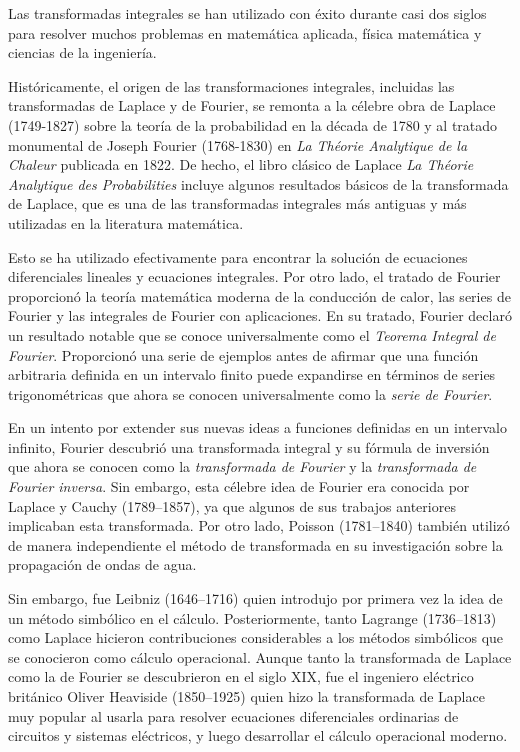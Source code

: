 Las transformadas integrales se han utilizado con éxito durante casi dos siglos para resolver muchos problemas en matemática aplicada, física matemática y ciencias de la ingeniería.
\par
Históricamente, el origen de las transformaciones integrales, incluidas las transformadas de Laplace y de Fourier, se remonta a la célebre obra de Laplace (1749-1827) sobre la teoría de la probabilidad en la década de 1780 y al tratado monumental de Joseph Fourier (1768-1830) en \emph{La Théorie Analytique de la Chaleur} publicada en 1822. De hecho, el libro clásico de Laplace \emph{La Théorie Analytique des Probabilities} incluye algunos resultados básicos de la transformada de Laplace, que es una de las transformadas integrales más antiguas y más utilizadas en la literatura matemática. 
\par
Esto se ha utilizado efectivamente para encontrar la solución de ecuaciones diferenciales lineales y ecuaciones integrales. Por otro lado, el tratado de Fourier proporcionó la teoría matemática moderna de la conducción de calor, las series de Fourier y las integrales de Fourier con aplicaciones. En su tratado, Fourier declaró un resultado notable que se conoce universalmente como el \emph{Teorema Integral de Fourier}. Proporcionó una serie de ejemplos antes de afirmar que una función arbitraria definida en un intervalo finito puede expandirse en términos de series trigonométricas que ahora se conocen universalmente como la \emph{serie de Fourier}.
\par
En un intento por extender sus nuevas ideas a funciones definidas en un intervalo infinito, Fourier descubrió una transformada integral y su fórmula de inversión que ahora se conocen como la \emph{transformada de Fourier} y la \emph{transformada de Fourier inversa}. Sin embargo, esta célebre idea de Fourier era conocida por Laplace y Cauchy (1789–1857), ya que algunos de sus trabajos anteriores implicaban esta transformada. Por otro lado, Poisson (1781–1840) también utilizó de manera independiente el método de transformada en su investigación sobre la propagación de ondas de agua.
\par
Sin embargo, fue Leibniz (1646–1716) quien introdujo por primera vez la idea de un método simbólico en el cálculo. Posteriormente, tanto Lagrange (1736–1813) como Laplace hicieron contribuciones considerables a los métodos simbólicos que se conocieron como cálculo operacional. Aunque tanto la transformada de Laplace como la de Fourier se descubrieron en el siglo XIX, fue el ingeniero eléctrico británico Oliver Heaviside (1850–1925) quien hizo la transformada de Laplace muy popular al usarla para resolver ecuaciones diferenciales ordinarias de circuitos y sistemas eléctricos, y luego desarrollar el cálculo operacional moderno.
